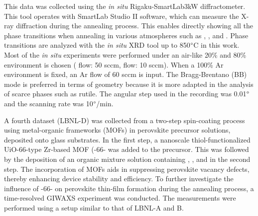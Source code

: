 This data was collected using the \textit{in situ} Rigaku-SmartLab3kW diffractometer. This tool operates with SmartLab Studio II software, which can measure the X-ray diffraction during the annealing process. This enables directly showing all the phase transitions when annealing in various atmospheres such as , , and . Phase transitions are analyzed with the \textit{in situ} XRD tool up to 850$\degree$C in this work. Most of the \textit{in situ} experiments were performed under an air-like 20\%  and 80\%  environment is chosen ( flow: 50 \si{sccm},  flow: 10 \si{sccm}). When a 100\% Ar environment is fixed, an Ar flow of 60 \si{sccm} is input. The Bragg-Brentano (BB) mode is preferred in terms of geometry because it is more adapted in the analysis of scarce phases such as   rutile. The angular step used in the recording was 0.01$\degree$ and the scanning rate was 10$\degree$/min. 

A fourth dataset (LBNL-D) was collected from a two-step spin-coating process using metal-organic frameworks (MOFs) in perovskite precursor solutions, deposited onto glass substrates. In the first step, a nanoscale thiol-functionalized UiO-66-type Zr-based MOF (-66- was added to the  precursor. This was followed by the deposition of an organic mixture solution containing , , and  in the second step. The incorporation of MOFs aids in suppressing perovskite vacancy defects, thereby enhancing device stability and efficiency. To further investigate the influence of -66- on perovskite thin-film formation during the annealing process, a time-resolved GIWAXS experiment was conducted. The measurements were performed using a setup similar to that of LBNL-A and B.
